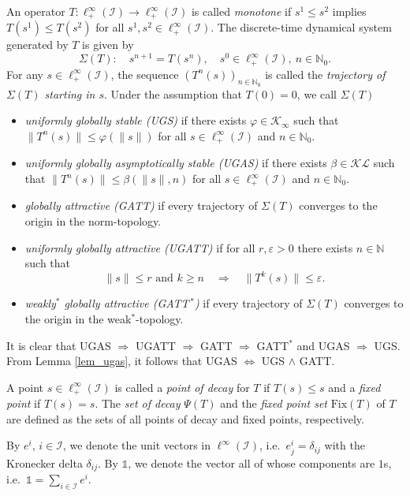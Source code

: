 \documentclass[10pt, oneside, a4paper]{article}
\newcommand{\N}{\mathbb{N}}
\newcommand{\ep}{\varepsilon}
\newcommand{\unit}{\mathds{1}}
\newcommand{\Fix}{\mathrm{Fix}}
\newcommand{\IC}{\mathcal{I}}
\newcommand{\KC}{\mathcal{K}}
\newcommand{\LC}{\mathcal{L}}
\begin{document}
An operator $T:\ell^{\infty}_+(\IC) \rightarrow \ell^{\infty}_+(\IC)$ is called \emph{monotone} if $s^1 \leq s^2$ implies $T(s^1) \leq T(s^2)$ for all $s^1,s^2 \in \ell^{\infty}_+(\IC)$. The discrete-time dynamical system generated by $T$ is given by%
\begin{equation*}
  \Sigma(T):\quad s^{n+1} = T(s^n),\quad s^0 \in \ell^{\infty}_+(\IC),\ n \in \N_0.%
\end{equation*}
For any $s \in \ell^{\infty}_+(\IC)$, the sequence $(T^n(s))_{n\in\N_0}$ is called the \emph{trajectory of $\Sigma(T)$ starting in $s$}. Under the assumption that $T(0) = 0$, we call $\Sigma(T)$%
\begin{itemize}
\item \emph{uniformly globally stable (UGS)} if there exists $\varphi \in \KC_{\infty}$ such that $\|T^n(s)\| \leq \varphi(\|s\|)$ for all $s \in \ell^{\infty}_+(\IC)$ and $n \in \N_0$.%
\item \emph{uniformly globally asymptotically stable (UGAS)} if there exists $\beta \in \KC\LC$ such that $\|T^n(s)\| \leq \beta(\|s\|,n)$ for all $s \in \ell^{\infty}_+(\IC)$ and $n \in \N_0$.%
\item \emph{globally attractive (GATT)} if every trajectory of $\Sigma(T)$ converges to the origin in the norm-topology.%
\item \emph{uniformly globally attractive (UGATT)} if for all $r,\ep > 0$ there exists $n \in \N$ such that%
\begin{equation*}
  \|s\| \leq r \mbox{\ and\ } k \geq n \quad\Rightarrow\quad \|T^k(s)\| \leq \ep.%
\end{equation*}
\item \emph{weakly$^*$ globally attractive (GATT$^{\,*}$)} if every trajectory of $\Sigma(T)$ converges to the origin in the weak$^*$-topology.%
\end{itemize}
It is clear that UGAS $\Rightarrow$ UGATT $\Rightarrow$ GATT $\Rightarrow$ GATT$^*$ and UGAS $\Rightarrow$ UGS. From Lemma \ref{lem_ugas}, it follows that UGAS $\Leftrightarrow$ UGS $\wedge$ GATT.%

A point $s \in \ell^{\infty}_+(\IC)$ is called a \emph{point of decay} for $T$ if $T(s) \leq s$ and a \emph{fixed point} if $T(s) = s$. The \emph{set of decay} $\Psi(T)$ and the \emph{fixed point set} $\Fix(T)$ of $T$ are defined as the sets of all points of decay and fixed points, respectively.%

By $e^i$, $i \in \IC$, we denote the unit vectors in $\ell^{\infty}(\IC)$, i.e.~$e^i_j = \delta_{ij}$ with the Kronecker delta $\delta_{ij}$. By $\unit$, we denote the vector all of whose components are $1$s, i.e.~$\unit = \sum_{i\in\IC}e^i$.%
\end{document}
